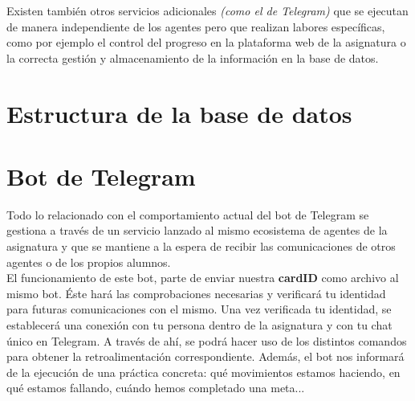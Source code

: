 Existen también otros servicios adicionales \textit{(como el de Telegram)} que se ejecutan de manera independiente de los agentes pero que realizan labores específicas, como por ejemplo el control del progreso en la plataforma web de la asignatura o la correcta gestión y almacenamiento de la información en la base de datos.

\section{Estructura de la base de datos}

\section{Bot de Telegram}

Todo lo relacionado con el comportamiento actual del bot de Telegram se gestiona a través de un servicio lanzado al mismo ecosistema de agentes de la asignatura y que se mantiene a la espera de recibir las comunicaciones de otros agentes o de los propios alumnos.\\

El funcionamiento de este bot, parte de enviar nuestra \textbf{cardID} como archivo al mismo bot. Éste hará las comprobaciones necesarias y verificará tu identidad para futuras comunicaciones con el mismo. Una vez verificada tu identidad, se establecerá una conexión con tu persona dentro de la asignatura y con tu chat único en Telegram. A través de ahí, se podrá hacer uso de los distintos comandos para obtener la retroalimentación correspondiente. Además, el bot nos informará de la ejecución de una práctica concreta: qué movimientos estamos haciendo, en qué estamos fallando, cuándo hemos completado una meta...